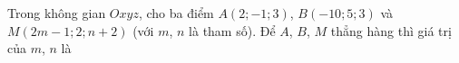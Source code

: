 \begin{ex}
Trong không gian $Oxyz$, cho ba điểm $A(2;-1;3)$, $B(-10;5;3)$ và $M(2m-1;2;n+2)$ (với $m$, $n$ là tham số). Để $A$, $B$, $M$ thẳng hàng thì giá trị của $m$, $n$ là
\end{ex}
